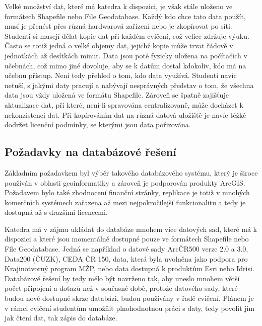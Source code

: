 Velké množství dat, které má katedra k dispozici, je však stále uloženo ve formátech Shapefile nebo File Geodatabase. Každý kdo chce tato data použít, musí je přenést přes různá hardwarová zařízení nebo je zkopírovat po síti. Studenti si musejí dělat kopie dat při každém cvičení, což velice zdržuje výuku. Často se totiž jedná o velké objemy dat, jejichž kopie může trvat řádově v jednotkách až desítkách minut. Data jsou poté fyzicky uložena na počítačích v učebnách, což mimo jiné dovoluje, aby se k datům dostal kdokoliv, kdo má na učebnu přístup. Není tedy přehled o tom, kdo data využívá. Studenti navíc netuší, s jakými daty pracují a nabývají nesprávných představ o tom, že všechna data jsou vždy uložená ve formátu Shapefile. Zároveň se špatně zajišťuje aktualizace dat, při které, není-li spravována centralizovaně, může docházet k nekonzistenci dat. Při kopírováním dat na různá datová uložiště je navíc těžké dodržet licenční podmínky, se kterými jsou data pořizována. 

\subsection{Požadavky na databázové řešení}
\label{kPozadavky}

Základním požadavkem byl výběr takového databázového systému, který je široce používán v oblasti geoinformatiky a zároveň je podporován produkty ArcGIS. Požadavem bylo také zhodnocení finanční stránky, replikace je totiž v mnohých komerčních systémech zařazena až mezi nejpokročilejší funkcionalitu a tedy je dostupná až s drazšími licencemi. 

Katedra má v zájmu ukládat do databáze mnohem více datových sad, které má k dispozici a které jsou momentálně dostupné pouze ve formátech Shapefile nebo File Geodatabase. Jedná se například o datové sady ArcČR500 verze 2.0 a 3.0, Data200 (ČUZK), CEDA ČR 150, data, která byla uvolněna jako podpora pro Krajinotvorný program MŽP, nebo data dostupná k produktům Esri nebo Idrisi. Databázové řešení by tedy mělo být navrženo tak, aby uneslo mnohem větší počet připojení a dotazů než v současné době, protože datového sady, které budou nově dostupné skrze databázi, budou používány v řadě cvičení. Plánem je v rámci cvičení studentům umožňit plnohodnotnou práci s daty, tedy povolit jim jak čtení dat, tak zápis do databáze. 

